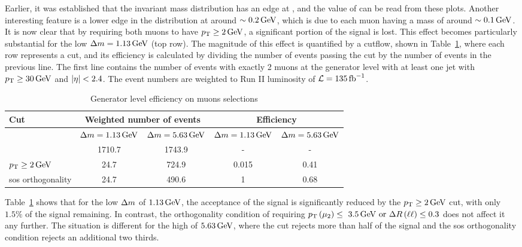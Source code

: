 Earlier, it was established that the invariant mass distribution has an edge at \dm, and the value of \dm can be read from these plots. Another interesting feature is a lower edge in the \dm distribution at around $\sim 0.2\,\text{Ge\hspace{-.08em}V}$, which is due to each muon having a mass of around $\sim 0.1\,\text{Ge\hspace{-.08em}V}$. It is now clear that by requiring both muons to have $p_{\mathrm{T}}\geq 2\,\text{Ge\hspace{-.08em}V}$, a significant portion of the signal is lost. This effect becomes particularly substantial for the low $\Delta m=1.13\,\text{Ge\hspace{-.08em}V}$ (top row). The magnitude of this effect is quantified by a cutflow, shown in Table~\ref{tab:gen-muon-pt-dr-efficiency}, where each row represents a cut, and its efficiency is calculated by dividing the number of events passing the cut by the number of events in the previous line. The first line contains the number of events with exactly 2 muons at the generator level with at least one jet with $p_{\mathrm{T}} \geq 30\,\text{Ge\hspace{-.08em}V}$ and $\abs{\eta}<2.4$. The event numbers are weighted to Run II luminosity of $\mathcal{L} = 135 \mbox{\ensuremath{\,\text{fb}^{-1}}}$.

\begin{table}[!htb]
	\centering
	
		\caption{\label{tab:gen-muon-pt-dr-efficiency}Generator level efficiency on muons selections}
			\begin{tabular}{l|cc|cc} \hline
			Cut & \multicolumn{2}{c|}{Weighted number of events} & \multicolumn{2}{c}{Efficiency} \\ \hline
			
			 & $\Delta m=1.13\,\text{Ge\hspace{-.08em}V}$ & $\Delta m=5.63\,\text{Ge\hspace{-.08em}V}$ & $\Delta m=1.13\,\text{Ge\hspace{-.08em}V}$ & $\Delta m=5.63\,\text{Ge\hspace{-.08em}V}$ \\
			 & 1710.7 & 1743.9 & - & -\\
			$p_{\mathrm{T}}\geq 2\,\text{Ge\hspace{-.08em}V}$ & 24.7 & 724.9 & 0.015 & 0.41\\
			\gls{sos} orthogonality & 24.7 & 490.6 & 1 & 0.68 \\ \hline
			\end{tabular}
\end{table}

Table~\ref{tab:gen-muon-pt-dr-efficiency} shows that for the low $\Delta m$ of $1.13\,\text{Ge\hspace{-.08em}V}$, the acceptance of the signal is significantly reduced by the $p_{\mathrm{T}}\geq 2\,\text{Ge\hspace{-.08em}V}$ cut, with only $1.5\%$ of the signal remaining. In contrast, the orthogonality condition of requiring $p_{\mathrm{T}}\left(\mu_2\right)\leq~3.5\,\text{Ge\hspace{-.08em}V}\text{ or }\Delta R\left(\ell\ell\right)\leq 0.3$ does not affect it any further. The situation is different for the high \dm of $5.63\,\text{Ge\hspace{-.08em}V}$, where the \pt cut rejects more than half of the signal and the \gls{sos} orthogonality condition rejects an additional two thirds.

